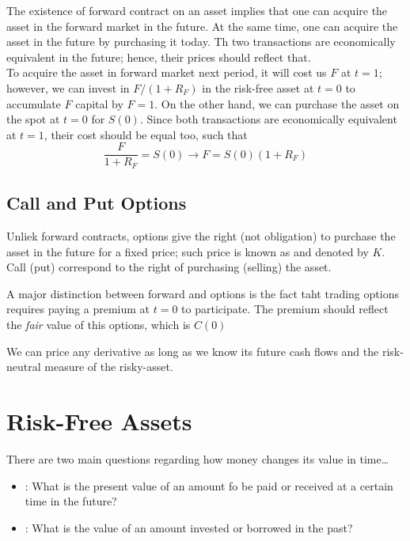 \documentclass{article}
\begin{document}
The existence of forward contract on an asset implies that one can acquire the asset in the forward market in the future. At the same time, one can acquire the asset in the future by purchasing it today. Th two transactions are economically equivalent in the future; hence, their prices should reflect that. \\ 

To acquire the asset in forward market next period, it will cost us $F$ at $t=1$; however, we can invest in $F/(1 + R_F)$ in the risk-free asset at $t=0$ to accumulate $F$ capital by $F=1$. On the other hand, we can purchase the asset on the spot at $t=0$ for $S(0)$. Since both transactions are economically equivalent at $t=1$, their cost should be equal too, such that $$\frac{F}{1 + R_F} = S(0) \rightarrow F = S(0)(1 + R_F)$$

\subsection{Call and Put Options}

Unliek forward contracts, options give the right (not obligation) to purchase the asset in the future for a fixed price; such price is known as  and denoted by $K$. Call (put) correspond to the right of purchasing (selling) the asset. 

\begin{remark}
  A major distinction between forward and options is the fact taht trading options requires paying a premium at $t=0$ to participate. The premium should reflect the \emph{fair} value of this options, which is $C(0)$
\end{remark}

We can price any derivative as long as we know its future cash flows and the risk-neutral measure of the risky-asset. 

\section{Risk-Free Assets}

There are two main questions regarding how money changes its value in time\dots
\begin{itemize}
  \item {}: What is the present value of an amount fo be paid or received at a certain time in the future? 
  \item {}: What is the value of an amount invested or borrowed in the past?
\end{itemize}
\end{document}

